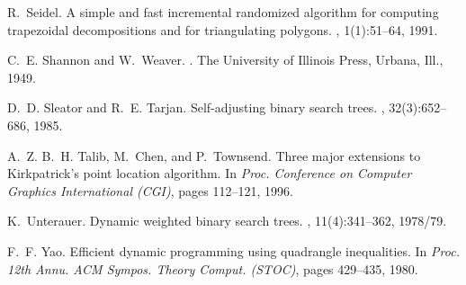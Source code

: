 \documentclass[11pt]{article}
\begin{document}
\begin{thebibliography}{10}
R.~Seidel.
\newblock A simple and fast incremental randomized algorithm for computing
  trapezoidal decompositions and for triangulating polygons.
, 1(1):51--64, 1991.

C.~E. Shannon and W.~Weaver.
.
\newblock The University of Illinois Press, Urbana, Ill., 1949.

D.~D. Sleator and R.~E. Tarjan.
\newblock Self-adjusting binary search trees.
, 32(3):652--686, 1985.

A.~Z. B.~H. Talib, M.~Chen, and P.~Townsend.
\newblock Three major extensions to {K}irkpatrick's point location algorithm.
\newblock In {\em Proc. Conference on Computer Graphics International (CGI)},
  pages 112--121, 1996.

K.~Unterauer.
\newblock Dynamic weighted binary search trees.
, 11(4):341--362, 1978/79.

F.~F. Yao.
\newblock Efficient dynamic programming using quadrangle inequalities.
\newblock In {\em Proc. 12th Annu. ACM Sympos. Theory Comput. (STOC)}, pages
  429--435, 1980.

\end{thebibliography}
\end{document}
